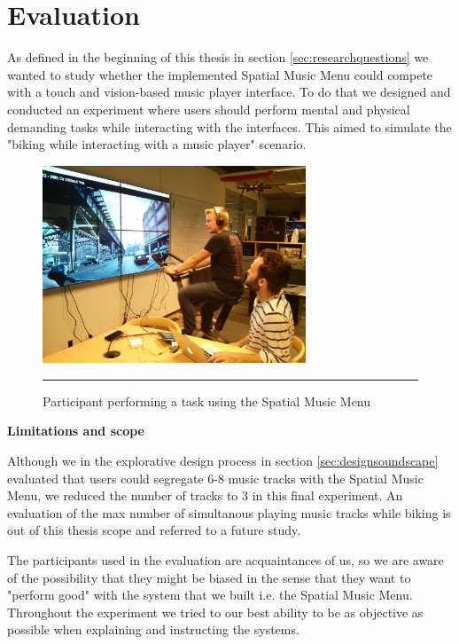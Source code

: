\chapter{Evaluation}
\label{sec:evaluation}
As defined in the beginning of this thesis in section \ref{sec:researchquestions} we wanted to study whether the implemented Spatial Music Menu could compete with a touch and vision-based music player interface. To do that we designed and conducted an experiment where users should perform mental and physical demanding tasks while interacting with the interfaces. This aimed to simulate the "biking while interacting with a music player" scenario.

\begin{figure}[h]
	\centering
		\includegraphics[width=0.7\textwidth,height=\textheight,keepaspectratio]{./Figures/evaluation_spatial.jpg}
		\rule{35em}{1pt}
	\caption[Evaluation Spatial Music Menu]{Participant performing a task using the Spatial Music Menu}
	\label{fig:evalspatial}
\end{figure}

\textbf{Limitations and scope}

Although we in the explorative design process in section \ref{sec:designsoundscape} evaluated that users could segregate 6-8 music tracks with the Spatial Music Menu, we reduced the number of tracks to 3 in this final experiment. An evaluation of the max number of simultanous playing music tracks while biking is out of this thesis scope and referred to a future study.

The participants used in the evaluation are acquaintances of us, so we are aware of the possibility that they might be biased in the sense that they want to "perform good" with the system that we built i.e. the Spatial Music Menu. Throughout the experiment we tried to our best ability to be as objective as possible when explaining and instructing the systems.


